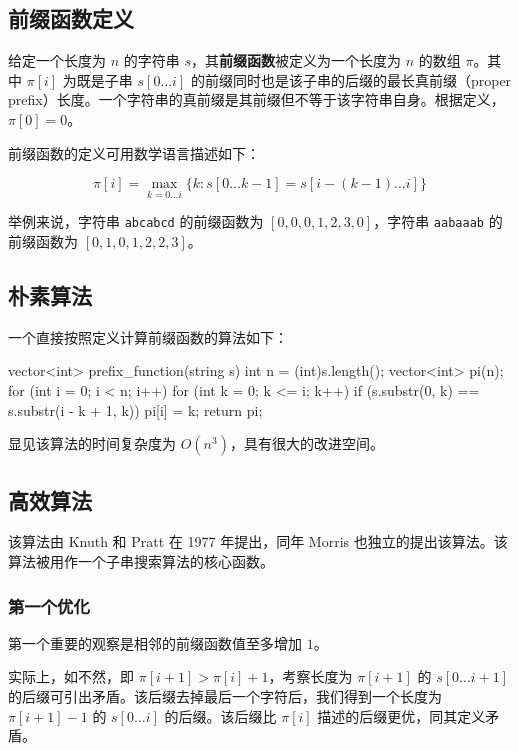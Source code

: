
\subsection{前缀函数定义}

给定一个长度为 $n$ 的字符串 $s$，其\textbf{前缀函数}被定义为一个长度为 $n$ 的数组 $\pi$。其中 $\pi[i]$ 为既是子串 $s[0\dots i]$ 的前缀同时也是该子串的后缀的最长真前缀（proper prefix）长度。一个字符串的真前缀是其前缀但不等于该字符串自身。根据定义，$\pi[0] = 0$。

前缀函数的定义可用数学语言描述如下：

$$
\pi[i] = \max_{k = 0 \dots i}\{k: s[0 \dots k - 1] = s[i - (k - 1) \dots i]\}
$$

举例来说，字符串 \texttt{abcabcd} 的前缀函数为 $[0, 0, 0, 1, 2, 3, 0]$，字符串 \texttt{aabaaab} 的前缀函数为 $[0, 1, 0, 1, 2, 2, 3]$。

\subsection{朴素算法}

一个直接按照定义计算前缀函数的算法如下：

\begin{cppcode}
vector<int> prefix_function(string s) {
  int n = (int)s.length();
  vector<int> pi(n);
  for (int i = 0; i < n; i++)
    for (int k = 0; k <= i; k++)
      if (s.substr(0, k) == s.substr(i - k + 1, k)) pi[i] = k;
  return pi;
}
\end{cppcode}

显见该算法的时间复杂度为 $O(n^3)$，具有很大的改进空间。

\subsection{高效算法}

该算法由 Knuth 和 Pratt 在 1977 年提出，同年 Morris 也独立的提出该算法。该算法被用作一个子串搜索算法的核心函数。

\subsubsection{第一个优化}

第一个重要的观察是相邻的前缀函数值至多增加 $1$。

实际上，如不然，即 $\pi[i + 1] > \pi[i] + 1$，考察长度为 $\pi[i + 1]$ 的 $s[0 \dots i + 1]$ 的后缀可引出矛盾。该后缀去掉最后一个字符后，我们得到一个长度为 $\pi[i + 1] - 1$ 的 $s[0 \dots i]$ 的后缀。该后缀比 $\pi[i]$ 描述的后缀更优，同其定义矛盾。

